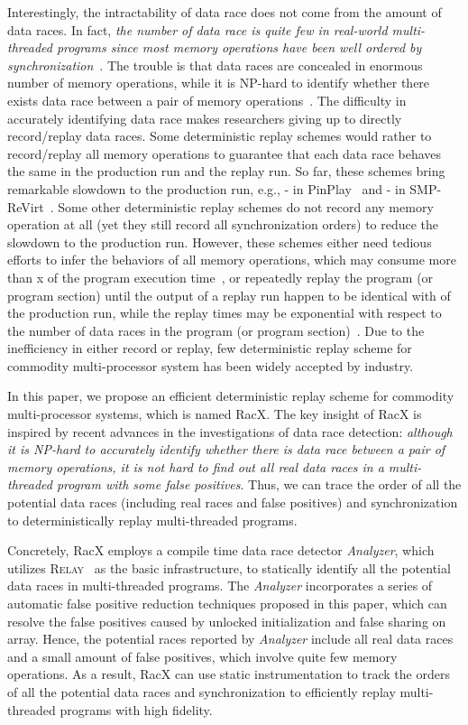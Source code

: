 \documentclass[10pt,onecolumn,letterpaper]{article}
\begin{document}
Interestingly, the intractability of data race does not come from
the amount of data races. In fact, \emph{the number of data race is
quite few in real-world multi-threaded programs since most memory
operations have been well ordered by
synchronization}~\cite{Marino09PLDI}. The trouble is that data races
are concealed in enormous number of memory operations, while it is
NP-hard to identify whether there exists data race between a pair of
memory operations~\cite{Netzer90ICPP}. The difficulty in accurately
identifying data race makes researchers giving up to directly
record/replay data races. Some deterministic replay schemes would
rather to record/replay all memory operations to guarantee that each
data race behaves the same in the production run and the replay run.
So far, these schemes bring remarkable slowdown to the production
run, e.g., - in PinPlay~\cite{Patil10CGO} and
- in SMP-ReVirt~\cite{Dunlap08VEE}. Some other
deterministic replay schemes do not record any memory operation at
all (yet they still record all synchronization orders) to reduce the
slowdown to the production run. However, these schemes either need
tedious efforts to infer the behaviors of all memory operations,
which may consume more than x of the program execution
time~\cite{Altekar09SOSP}, or repeatedly replay the program (or
program section) until the output of a replay run happen to be
identical with of the production run, while the replay times may be
exponential with respect to the number of data races in the program
(or program section)~\cite{Park09SOSP,Lee09MICRO}. Due to the
inefficiency in either record or replay, few deterministic replay
scheme for commodity multi-processor system has been widely accepted
by industry.

In this paper, we propose an efficient deterministic replay scheme
for commodity multi-processor systems, which is named RacX. The key
insight of RacX is inspired by recent advances in the investigations
of data race detection: \emph{although it is NP-hard to accurately
identify whether there is data race between a pair of memory
operations, it is not hard to find out all real data races in a
multi-threaded program with some false positives}. Thus, we can
trace the order of all the potential data races (including real
races and false positives) and synchronization to deterministically
replay multi-threaded programs.

Concretely, RacX employs a compile time data race detector
\emph{Analyzer}, which utilizes R\textsc{elay}~\cite{Voung07FSE} as
the basic infrastructure, to statically identify all the potential
data races in multi-threaded programs. The \emph{Analyzer}
incorporates a series of automatic false positive reduction
techniques proposed in this paper, which can resolve the false
positives caused by unlocked initialization and false sharing on
array. Hence, the potential races reported by \emph{Analyzer}
include all real data races and a small amount of false positives,
which involve quite few memory operations. As a result, RacX can use
static instrumentation to track the orders of all the potential data
races and synchronization to efficiently replay multi-threaded
programs with high fidelity.
\end{document}
